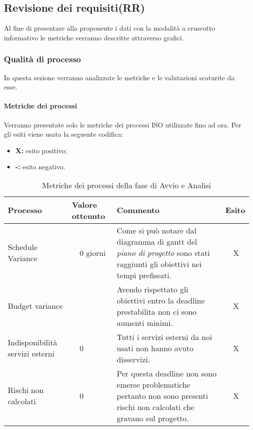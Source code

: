 \subsection{Revisione dei requisiti(RR)}
Al fine di presentare alla proponente i dati con la modalità a cruscotto informativo le metriche verranno descritte attraverso grafici.
\subsubsection{Qualità di processo}
In questa sezione verranno analizzate le metriche e le valutazioni scaturite da esse.
\clearpage
\paragraph{Metriche dei processi}
\hspace{10cm}
\newline Verranno presentate solo le metriche dei processi ISO utilizzate fino ad ora.
Per gli esiti viene usata la seguente codifica:
\begin{itemize}
	\item \textbf{X: } esito positivo;
	\item \textbf{-: } esito negativo.
\end{itemize}
\begin{table}[!htbp]
	\centering
	\renewcommand{\arraystretch}{2} 
	\begin{tabular}{|l|p{2cm}|p{7cm}|l|}
		\rowcolor{orange!50}
		\hline
		\textbf{Processo} & \textbf{Valore ottenuto} & \textbf{Commento} & \textbf{Esito} \\
		\hline
		Schedule Variance & ~~0 giorni & Come si può notare dal diagramma di gantt del \textit{piano di progetto} sono stati raggiunti gli obiettivi nei tempi prefissati. & ~~X \\
		\hline
		Budget variance & ~~\EUR{ -5} & Avendo rispettato gli obiettivi entro la deadline prestabilita non ci sono aumenti minimi. &  ~~X \\
		\hline
		{Indisponibilità servizi esterni} & ~~0 & Tutti i servizi esterni da noi usati non hanno avuto disservizi.  & ~~X\\
		\hline
		Rischi non calcolati & ~~0 & Per questa deadline non sono emerse problematiche pertanto non sono presenti rischi non calcolati che gravano sul progetto. & ~~X\\
		\hline
	\end{tabular}
	\caption{Metriche dei processi della fase di Avvio e Analisi}
\end{table}
\clearpage
